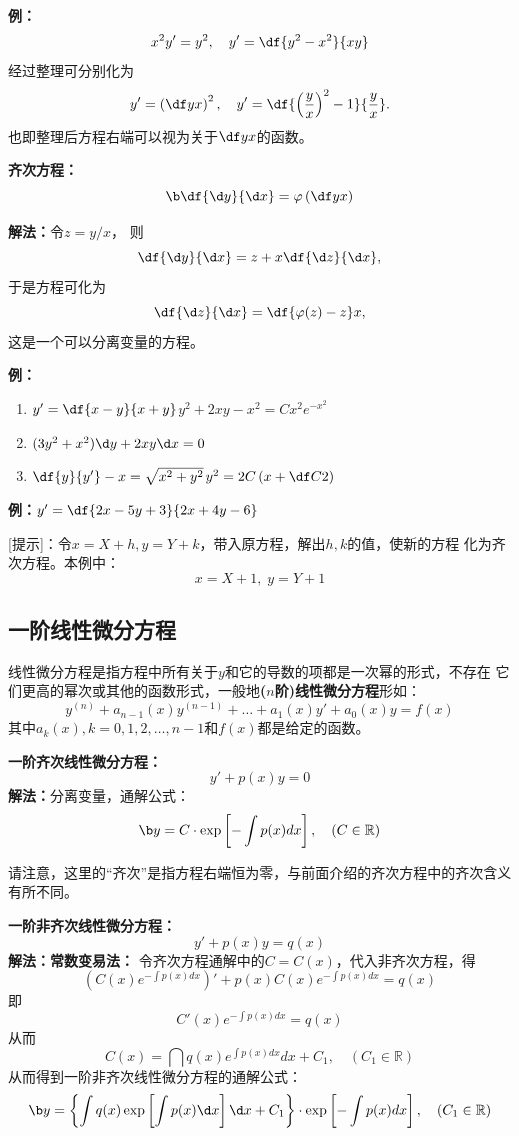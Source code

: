 {\bf 例：}
$$x^2y'=y^2,\quad y'=\df{y^2-x^2}{xy}$$ 
经过整理可分别化为
$$y'=\left(\df yx\right)^2,\quad
y'=\df{\left(\frac yx\right)^2-1}{\frac yx}.$$
也即整理后方程右端可以视为关于$\df yx$的函数。

\begin{thx}
	{\bf 齐次方程：}
	$${\b\df{\d y}{\d x}=\varphi\left(\df yx\right)}$$

	{\bf 解法：}令$z=y/x$， 则
	$$\df{\d y}{\d x}=z+x\df{\d z}{\d x},$$
	于是方程可化为
	$$\df{\d z}{\d x}=\df{\varphi(z)-z}x,$$
	这是一个可以分离变量的方程。
\end{thx}

{\bf 例：}
\begin{enumerate}[(1)]
  \setlength{\itemindent}{1cm}
  \item $y'=\df{x-y}{x+y}$\hfill $y^2+2xy-x^2=Cx^2e^{-x^2}$
  \item $(3y^2+x^2)\d y+2xy\d x=0$
  \item $\df{y}{y'}-x=\sqrt{x^2+y^2}$\hfill $y^2=2C\left(x+\df C2\right)$
\end{enumerate}

{\bf 例：}$y'=\df{2x-5y+3}{2x+4y-6}$

[提示]：令$x=X+h,y=Y+k$，带入原方程，解出$h,k$的值，使新的方程
化为齐次方程。本例中：
$$x=X+1,\;y=Y+1$$

\subsection{一阶线性微分方程}

线性微分方程是指方程中所有关于$y$和它的导数的项都是一次幂的形式，不存在
它们更高的幂次或其他的函数形式，一般地{\bf ($n$阶)线性微分方程}形如：
$$y^{(n)}+a_{n-1}(x)y^{(n-1)}+\ldots+a_1(x)y'+a_0(x)y=f(x)$$
其中$a_k(x),k=0,1,2,\ldots,n-1$和$f(x)$都是给定的函数。

\begin{thx}
	{\bf 一阶齐次线性微分方程：}
	$$y'+p(x)y=0$$
	{\bf 解法：}分离变量，通解公式：
	$${\b y=C\cdot\exp\left[-\int p(x)dx\right],\quad(C\in\mathbb{R})}$$
\end{thx}

请注意，这里的“齐次”是指方程右端恒为零，与前面介绍的齐次方程中的齐次含义有所不同。

\begin{thx}
	{\bf 一阶非齐次线性微分方程：}
	$$y'+p(x)y=q(x)$$
	{\bf 解法：}{\bf 常数变易法：}
	令齐次方程通解中的$C=C(x)$，代入非齐次方程，得
	$$\left(C(x)e^{-\int p(x)dx}\right)'+p(x)C(x)e^{-\int
	 p(x)dx}=q(x)$$
	即
	$$C'(x)e^{-\int p(x)dx}=q(x)$$
	从而
	$$C(x)=\dint q(x)e^{\int p(x)dx}dx+C_1,\quad(C_1\in\mathbb{R})$$ 
	从而得到一阶非齐次线性微分方程的通解公式：
	$${\b y=\left\{\int q(x)\exp\left[\int p(x)\d x\right]\d x+C_1\right\}
	\cdot\exp\left[-\int p(x)dx\right],\quad(C_1\in\mathbb{R})}$$
\end{thx}

